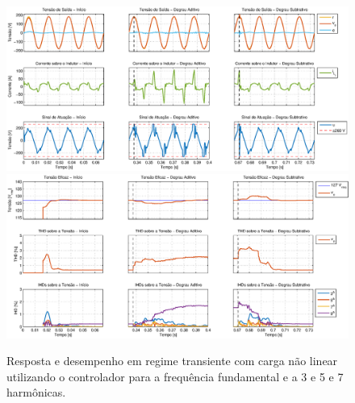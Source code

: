 \documentclass[repeatfields,oneside]{tcc}
\begin{document}
\begin{figure}[h]
    \centering
    \caption{Resposta e desempenho em regime transiente com carga não linear utilizando o controlador para a frequência fundamental e a 3{\textordfeminine} e 5{\textordfeminine} e 7{\textordfeminine} harmônicas.}
    \includegraphics[trim={80 50 1 20}, clip, width=\linewidth]{fig/closed_7.eps}
    \\\vspace{0.475cm}
    \includegraphics[trim={80 20 1 20}, clip, width=\linewidth]{fig/harm_7.eps}
\end{figure}
\end{document}
